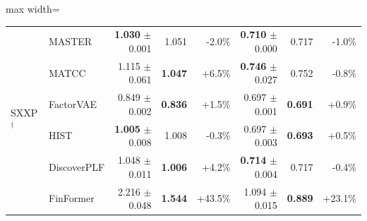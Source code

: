 \begin{table}[tb]
\begin{adjustbox}{max width=\textwidth}
{\begin{tabular}{llrrrrrr}
\midrule
\multirow{6}{*}{SXXP$^\dagger$} & MASTER & \textbf{1.030} {\scriptsize$\pm$0.001} & 1.051 & -2.0\% & \textbf{0.710} {\scriptsize$\pm$0.000} & 0.717 & -1.0\% \\
 & MATCC & 1.115 {\scriptsize$\pm$0.061} & \textbf{1.047} & +6.5\% & \textbf{0.746} {\scriptsize$\pm$0.027} & 0.752 & -0.8\% \\
 & FactorVAE & 0.849 {\scriptsize$\pm$0.002} & \textbf{0.836} & +1.5\% & 0.697 {\scriptsize$\pm$0.001} & \textbf{0.691} & +0.9\% \\
 & HIST & \textbf{1.005} {\scriptsize$\pm$0.008} & 1.008 & -0.3\% & 0.697 {\scriptsize$\pm$0.003} & \textbf{0.693} & +0.5\% \\
 & DiscoverPLF & 1.048 {\scriptsize$\pm$0.011} & \textbf{1.006} & +4.2\% & \textbf{0.714} {\scriptsize$\pm$0.004} & 0.717 & -0.4\% \\
 & FinFormer & 2.216 {\scriptsize$\pm$0.048} & \textbf{1.544} & +43.5\% & 1.094 {\scriptsize$\pm$0.015} & \textbf{0.889} & +23.1\% \\
\bottomrule
\end{tabular}
}
\end{adjustbox}
\label{tab:finbench_regression}
\end{table}
